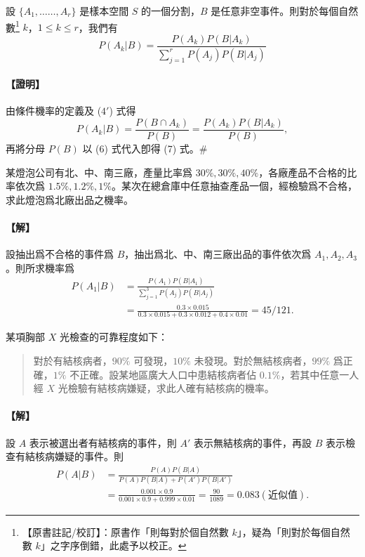 \medskip
\begin{theorem}[貝氏定理]\label{thm:b5s-4-5}
設 $\{A_1, \dots\dots, A_r\}$ 是樣本空間 $S$ 的一個分割，$B$ 是任意非空事件。則對於每個自然數\label{note:b5s-ch4-bayes-typo}\footnote{【原書註記/校訂】：原書作「則每對於個自然數 $k$」，疑為「則對於每個自然數 $k$」之字序倒錯，此處予以校正。} $k$，$1 \le k \le r$，我們有
\begin{equation}\tag{7}\label{eq:b5s-4-7}
P(A_k|B) = \frac{P(A_k) P(B|A_k)}{\sum_{j=1}^r P(A_j) P(B|A_j)}
\end{equation}
\end{theorem}
\paragraph{【證明】}
由條件機率的定義及 ($4'$) 式得
\[
P(A_k|B) = \frac{P(B \cap A_k)}{P(B)} = \frac{P(A_k) P(B|A_k)}{P(B)},
\]
再將分母 $P(B)$ 以 (6) 式代入卽得 (7) 式。\hfill\#

\medskip
\begin{example}\label{ex:b5s-4-11}
某燈泡公司有北、中、南三廠，產量比率爲 $30\%, 30\%, 40\%$，各廠產品不合格的比率依次爲 $1.5\%, 1.2\%, 1\%$。某次在總倉庫中任意抽查產品一個，經檢驗爲不合格，求此燈泡爲北廠出品之機率。
\end{example}
\paragraph{【解】}
設抽出爲不合格的事件爲 $B$，抽出爲北、中、南三廠出品的事件依次爲 $A_1, A_2, A_3$。則所求機率爲
\begin{align*}
P(A_1|B) &= \frac{P(A_1) P(B|A_1)}{\sum_{j=1}^3 P(A_j) P(B|A_j)} \\
&= \frac{0.3 \times 0.015}{0.3 \times 0.015 + 0.3 \times 0.012 + 0.4 \times 0.01} = 45/121. \tag*{\#}
\end{align*}

\medskip
\begin{example}\label{ex:b5s-4-12}
某項胸部 $X$ 光檢查的可靠程度如下：
\begin{quote}
對於有結核病者，$90\%$ 可發現，$10\%$ 未發現。對於無結核病者，$99\%$ 爲正確，$1\%$ 不正確。設某地區廣大人口中患結核病者佔 $0.1\%$，若其中任意一人經 $X$ 光檢驗有結核病嫌疑，求此人確有結核病的機率。
\end{quote}
\end{example}
\paragraph{【解】}
設 $A$ 表示被選出者有結核病的事件，則 $A'$ 表示無結核病的事件，再設 $B$ 表示檢查有結核病嫌疑的事件。則
\begin{align*}
P(A|B) &= \frac{P(A) P(B|A)}{P(A) P(B|A) + P(A') P(B|A')} \\
&= \frac{0.001 \times 0.9}{0.001 \times 0.9 + 0.999 \times 0.01} = \frac{90}{1089} = 0.083(\text{近似值}). \tag*{\#}
\end{align*}
